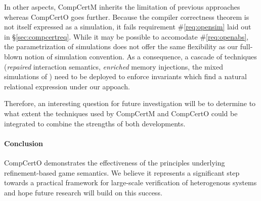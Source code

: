 \documentclass[acmsmall,authordraft]{acmart}
\begin{document}
In other aspects,
CompCertM inherits the limitation of previous approaches
whereas CompCertO goes further.
Because the compiler correctness theorem
is not itself expressed as a simulation,
it fails requirement \#\ref{req:opensim}
laid out in \S\ref{sec:compcertreq}.
While it may be possible to accomodate \#\ref{req:openabs},
the parametrization of simulations
does not offer the same flexibility as
our full-blown notion of simulation convention.
As a consequence, a cascade of techniques
(\emph{repaired} interaction semantics,
\emph{enriched} memory injections,
the mixed simulations of \cite{pilsner})
need to be deployed to enforce invariants
which find a natural relational expression
under our appoach.

Therefore,
an interesting question for future investigation
will be to determine to what extent
the techniques used by CompCertM and CompCertO
could be integrated to combine
the strengths of both developments.


\paragraph{Conclusion} %

CompCertO
demonstrates the effectiveness
of the principles underlying
refinement-based game semantics.
We believe it represents a significant step towards
a practical framework
for large-scale verification of heterogenous systems
and hope future research will build on this success.





\end{document}
